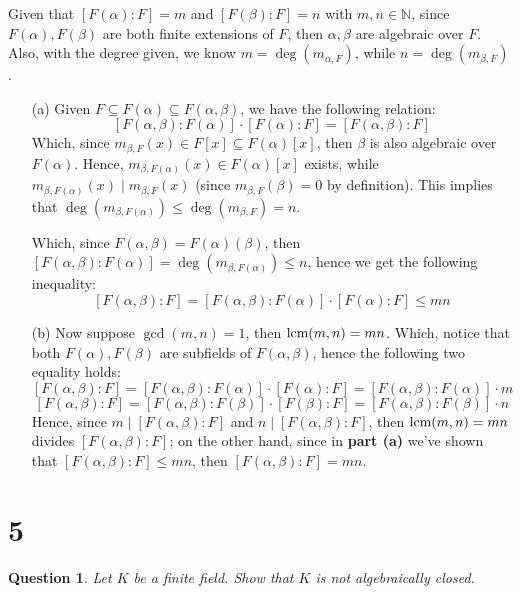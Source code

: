 \documentclass{article}
\newtheorem{question}{Question}
\begin{document}
Given that $[F(\alpha):F]=m$ and $[F(\beta):F]=n$ with $m,n\in\mathbb{N}$, since $F(\alpha),F(\beta)$ are both finite extensions of $F$, then $\alpha,\beta$ are algebraic over $F$. Also, with the degree given, we know $m = \deg(m_{\alpha,F})$, while $n=\deg(m_{\beta,F})$.
\begin{itemize}
    \item[(a)]
    Given $F\subseteq F(\alpha)\subseteq F(\alpha,\beta)$, we have the following relation:
    $$[F(\alpha,\beta):F(\alpha)]\cdot [F(\alpha):F]=[F(\alpha,\beta):F]$$
    Which, since $m_{\beta,F}(x)\in F[x]\subseteq F(\alpha)[x]$, then $\beta$ is also algebraic over $F(\alpha)$. Hence, $m_{\beta,F(\alpha)}(x)\in F(\alpha)[x]$ exists, while $m_{\beta,F(\alpha)}(x)\mid m_{\beta,F}(x)$ (since $m_{\beta,F}(\beta)=0$ by definition).
    This implies that $\deg(m_{\beta,F(\alpha)})\leq \deg(m_{\beta,F}) = n$.

    Which, since $F(\alpha,\beta) = F(\alpha)(\beta)$, then $[F(\alpha,\beta):F(\alpha)] = \deg(m_{\beta,F(\alpha)}) \leq n$, hence we get the following inequality:
    $$[F(\alpha,\beta):F]=[F(\alpha,\beta):F(\alpha)]\cdot [F(\alpha):F]\leq mn$$

    \hfil

    \item[(b)] Now suppose $\gcd(m,n)=1$, then $\textmd{lcm}(m,n)=mn$. Which, notice that both $F(\alpha),F(\beta)$ are subfields of $F(\alpha,\beta)$, hence the following two equality holds:
    $$[F(\alpha,\beta):F]=[F(\alpha,\beta):F(\alpha)]\cdot [F(\alpha):F] = [F(\alpha,\beta):F(\alpha)]\cdot m$$
    $$[F(\alpha,\beta):F]=[F(\alpha,\beta):F(\beta)]\cdot [F(\beta):F] = [F(\alpha,\beta):F(\beta)]\cdot n$$
    Hence, since $m\mid [F(\alpha,\beta):F]$ and $n\mid [F(\alpha,\beta):F]$, then $\textmd{lcm}(m,n)=mn$ divides $[F(\alpha,\beta):F]$; on the other hand, since in \textbf{part (a)} we've shown that $[F(\alpha,\beta):F]\leq mn$, then $[F(\alpha,\beta):F] = mn$.
\end{itemize}

\break

\section*{5}
\begin{myBox}[]{}
    \begin{question}
        Let $K$ be a finite field. Show that $K$ is not algebraically closed.
    \end{question}
\end{myBox}
\end{document}
